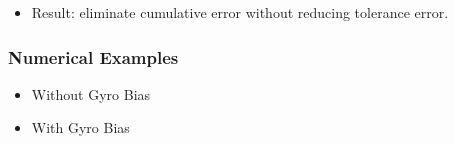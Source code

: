 \begin{frame}
{\begin{itemize}
\begin{itemize}
{\begin{gather*}
	\end{gather*}}
\vspace*{-0.4cm}	 
	\begin{figure} %
	\hspace*{-0.8cm}
    \centering\texttt{[image: fig\_4\_ni150.pdf]}
    \hspace*{0.8cm}
  	\end{figure}	
\vspace*{-0.3cm}  		
  	\item Result: eliminate cumulative error without reducing tolerance error.	
	\end{itemize}				
	\end{itemize}
}		
\end{frame}   %





\begin{frame} %
\frametitle{Numerical Examples}
	\begin{itemize} 
	\item Without Gyro Bias
		\begin{figure}
		\centering	
		\hspace*{-0.1\columnwidth}
		\end{figure}	
	\item With Gyro Bias
		\begin{figure}
		\centering	
		\hspace*{-0.11\columnwidth}
		\hspace*{-0.048\columnwidth}
		\hspace*{-0.048\columnwidth}			
		\hspace*{-0.048\columnwidth}			
		\end{figure}		
	\end{itemize}	
\end{frame}   %

